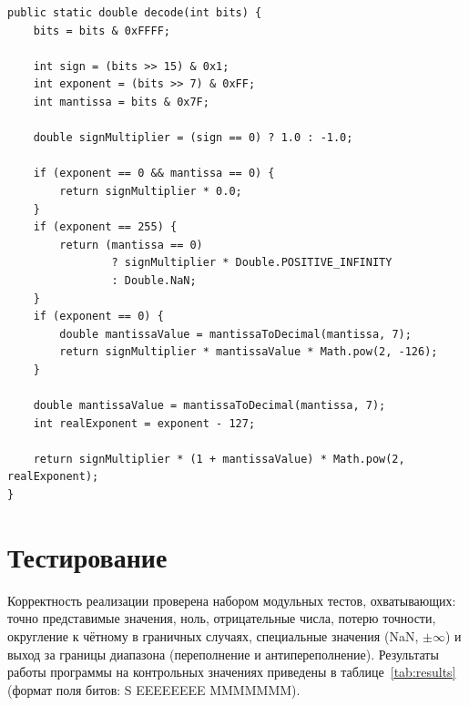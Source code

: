\documentclass[12pt,a4paper]{article}
\begin{document}
\begin{lstlisting}[caption={Декодирование BF16 в double}]
public static double decode(int bits) {
    bits = bits & 0xFFFF;

    int sign = (bits >> 15) & 0x1;
    int exponent = (bits >> 7) & 0xFF;
    int mantissa = bits & 0x7F;

    double signMultiplier = (sign == 0) ? 1.0 : -1.0;

    if (exponent == 0 && mantissa == 0) {
        return signMultiplier * 0.0;
    }
    if (exponent == 255) {
        return (mantissa == 0)
                ? signMultiplier * Double.POSITIVE_INFINITY
                : Double.NaN;
    }
    if (exponent == 0) {
        double mantissaValue = mantissaToDecimal(mantissa, 7);
        return signMultiplier * mantissaValue * Math.pow(2, -126);
    }

    double mantissaValue = mantissaToDecimal(mantissa, 7);
    int realExponent = exponent - 127;

    return signMultiplier * (1 + mantissaValue) * Math.pow(2, realExponent);
}
\end{lstlisting}

\section{Тестирование}

Корректность реализации проверена набором модульных тестов,
охватывающих: точно представимые значения, ноль, отрицательные числа,
потерю точности, округление к чётному в граничных случаях, специальные
значения (NaN, $\pm\infty$) и выход за границы диапазона (переполнение и
антипереполнение). Результаты работы программы на контрольных значениях
приведены в таблице~\ref{tab:results} (формат поля битов: S EEEEEEEE MMMMMMM).
\end{document}
